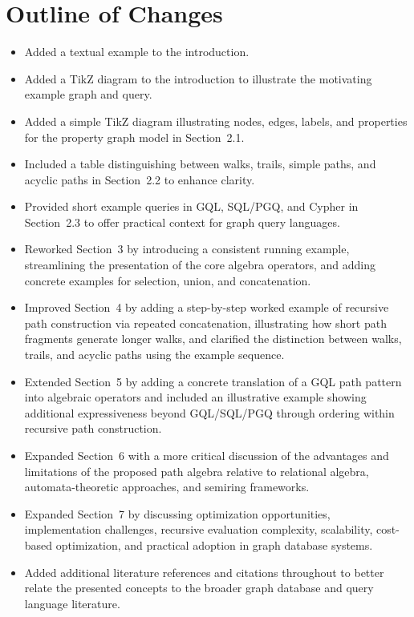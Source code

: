 \section*{Outline of Changes}

\begin{itemize}
  \item Added a textual example to the introduction.
  \item Added a TikZ diagram to the introduction to illustrate the motivating example graph and query.
  \item Added a simple TikZ diagram illustrating nodes, edges, labels, and properties for the property graph model in Section~2.1.
  \item Included a table distinguishing between walks, trails, simple paths, and acyclic paths in Section~2.2 to enhance clarity.
  \item Provided short example queries in GQL, SQL/PGQ, and Cypher in Section~2.3 to offer practical context for graph query languages.
  \item Reworked Section~3 by introducing a consistent running example, streamlining the presentation of the core algebra operators, and adding concrete examples for selection, union, and concatenation.
  \item Improved Section~4 by adding a step-by-step worked example of recursive path construction via repeated concatenation, illustrating how short path fragments generate longer walks, and clarified the distinction between walks, trails, and acyclic paths using the example sequence.
  \item Extended Section~5 by adding a concrete translation of a GQL path pattern into algebraic operators and included an illustrative example showing additional expressiveness beyond GQL/SQL/PGQ through ordering within recursive path construction.
  \item Expanded Section~6 with a more critical discussion of the advantages and limitations of the proposed path algebra relative to relational algebra, automata-theoretic approaches, and semiring frameworks.
  \item Expanded Section~7 by discussing optimization opportunities, implementation challenges, recursive evaluation complexity, scalability, cost-based optimization, and practical adoption in graph database systems.
  \item Added additional literature references and citations throughout to better relate the presented concepts to the broader graph database and query language literature.
\end{itemize}